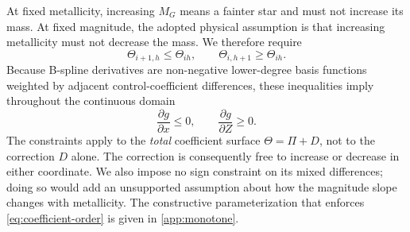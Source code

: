 At fixed metallicity, increasing $M_G$ means a fainter star and must not
increase its mass.  At fixed magnitude, the adopted physical assumption is
that increasing metallicity must not decrease the mass.  We therefore require
\begin{equation}
 \Theta_{i+1,h}\le\Theta_{ih},\qquad
 \Theta_{i,h+1}\ge\Theta_{ih}.
 \label{eq:coefficient-order}
\end{equation}
Because B-spline derivatives are non-negative lower-degree basis functions
weighted by adjacent control-coefficient differences, these inequalities imply
throughout the continuous domain
\begin{equation}
 \frac{\partial g}{\partial x}\le0,
 \qquad \frac{\partial g}{\partial Z}\ge0.
\end{equation}
The constraints apply to the \emph{total} coefficient surface $\Theta=\Pi+D$,
not to the correction $D$ alone.  The correction is consequently free to
increase or decrease in either coordinate.  We also impose no sign constraint
on its mixed differences; doing so would add an unsupported assumption about
how the magnitude slope changes with metallicity.  The constructive
parameterization that enforces \cref{eq:coefficient-order} is given in
\cref{app:monotone}.


